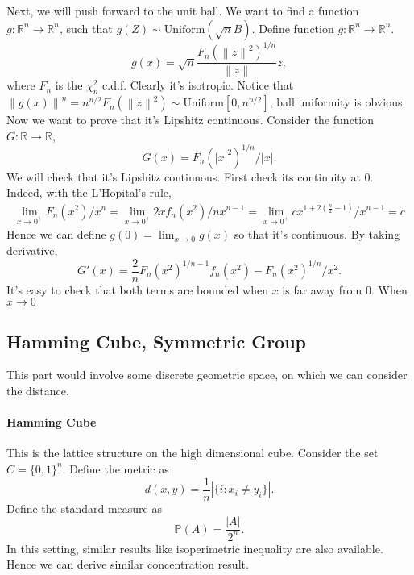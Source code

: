 \documentclass[9pt,onesided]{article}
\newcommand{\nm}[1]{\left\lVert#1\right\rVert}
\newcommand{\re}{\mathbb{R}}
\newcommand{\p}{\mathbb{P}}
\theoremstyle{definition}
\begin{document}
Next, we will push forward to the unit ball. We want to find a function $g:
\re^n\to \re^n$, such that $g(Z)\sim \mathrm{Uniform}(\sqrt{n}B) $. Define function $g:\re^n \to \re^n$.
\begin{equation*}
    g(x)=\sqrt{n}\frac{F_n(\nm{z}^2)^{1/n}}{\nm{z}} z,
\end{equation*}
where $F_n$ is the $\chi^2_n$ c.d.f.
Clearly it's isotropic. Notice that $\nm{g(x)}^n= n^{n/2}F_n(\nm{z}^2)\sim \mathrm{Uniform}[0,n^{n/2}]$, ball uniformity is obvious. Now we want to prove that it's Lipshitz continuous. Consider the function $G:\re \to \re$,
\begin{equation*}
    G(x)=F_n(|x|^2)^{1/n}/|x|. 
\end{equation*}
We will check that it's Lipshitz continuous. First check its continuity at 0. Indeed, with the L'Hopital's rule, 
\begin{align*}
    \lim_{x\to 0^+} F_n(x^2)/ x^n= \lim_{x\to 0^+}2xf_n(x^2)/nx^{n-1}=\lim_{x\to 0^+} c x^{1+2(\frac{n}{2}-1)}/x^{n-1}=c
\end{align*}
Hence we can define $g(0)=\lim_{x\to 0}g(x)$ so that it's continuous. 
By taking derivative,
\begin{equation*}
    G'(x)=\frac{2}{n} F_n(x^2)^{1/n-1} f_n(x^2)- F_n(x^2)^{1/n}/x^2.
\end{equation*}
It's easy to check that both terms are bounded when $x$ is far away from $0$. When $x\to 0$
\subsection{Hamming Cube, Symmetric Group}

This part would involve some discrete geometric space, on which we can consider the distance. 

\paragraph{Hamming Cube} This is the lattice structure on the high dimensional cube. Consider the set $C=\{0,1\}^n$. Define the metric as
\begin{equation*}
    d(x,y)=\frac{1}{n} |\{i:x_i\neq y_i\}|.
\end{equation*}
Define the standard measure as
\begin{equation*}
    \p(A)=\frac{|A|}{2^n}.
\end{equation*}
In this setting, similar results like isoperimetric inequality are also available. Hence we can derive similar concentration result.
\end{document}
